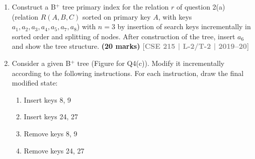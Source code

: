 \documentclass[12pt,a3paper]{article}
\newcommand{\btnode}[5]{%
    \node (#1) at #2 [minimum width=1.4cm, minimum height=0.8cm, inner sep=0pt] {};
    \begin{scope}[shift={(#1.south west)}]
        \draw[line width=0.7pt] (0,0) rectangle (1.4,0.8);
        \draw[line width=0.5pt] (0,0.4) -- (1.4,0.4);
        \draw[line width=0.5pt] (0.466,0.4) -- (0.466,0.8);
        \draw[line width=0.5pt] (0.933,0.4) -- (0.933,0.8);
        \draw[line width=0.5pt] (0.35,0) -- (0.35,0.4);
        \draw[line width=0.5pt] (0.70,0) -- (0.70,0.4);
        \draw[line width=0.5pt] (1.05,0) -- (1.05,0.4);
        \node[font=\sffamily\small\bfseries] at (0.233, 0.6) {#3};
        \node[font=\sffamily\small\bfseries] at (0.700, 0.6) {#4};
        \node[font=\sffamily\small\bfseries] at (1.166, 0.6) {#5};
    \end{scope}
    \coordinate (#1-p0) at ($(#1.south west) + (0.175, 0.2)$);
    \coordinate (#1-p1) at ($(#1.south west) + (0.525, 0.2)$);
    \coordinate (#1-p2) at ($(#1.south west) + (0.875, 0.2)$);
    \coordinate (#1-p3) at ($(#1.south west) + (1.225, 0.2)$);
    \coordinate (#1-top) at ($(#1.north west) + (0.7, 0)$);
    \coordinate (#1-leftbtm) at ($(#1.south west) + (0, 0.2)$);
}
\newcommand{\yr}[1]{\hfill\textcolor{gray}{\small\textbf{[#1]}}}
\newcommand{\mk}[1]{\textcolor{orange!70!black}{\small\textbf{(#1 marks)}}}
\begin{document}
\begin{enumerate}
\item Construct a B$^+$ tree primary index for the relation $r$ of question 2(a) (relation $R(A,B,C)$ sorted on primary key $A$, with keys $a_1, a_2, a_3, a_4, a_5, a_7, a_8$) with $n = 3$ by insertion of search keys incrementally in sorted order and splitting of nodes. After construction of the tree, insert $a_6$ and show the tree structure.
\mk{20} \yr{CSE 215 | L-2/T-2 | 2019--20}

\item Consider a given B$^+$ tree (Figure for Q4(c)). Modify it incrementally according to the following instructions. For each instruction, draw the final modified state:
\begin{enumerate}
  \item Insert keys 8, 9
  \item Insert keys 24, 27
  \item Remove keys 8, 9
  \item Remove keys 24, 27
\end{enumerate}

\begin{center}
  
\end{center}
\end{enumerate}
\end{document}

